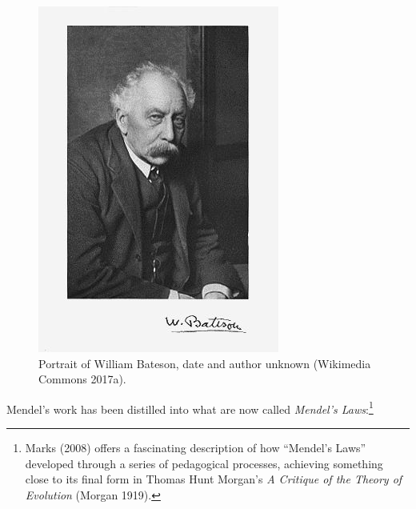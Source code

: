 \documentclass[
]{book}
\begin{document}
\begin{figure}

{\centering \includegraphics[width=1\linewidth]{figs/introduction/Bateson2} 

}

\caption{Portrait of William Bateson, date and author unknown (Wikimedia Commons 2017a).}\label{fig:bateson}
\end{figure}

Mendel's work has been distilled into what are now called \emph{Mendel's Laws}:\footnote{Marks (2008) offers a fascinating description of how ``Mendel's Laws'' developed through a series of pedagogical processes, achieving something close to its final form in Thomas Hunt Morgan's \emph{A Critique of the Theory of Evolution} (Morgan 1919).}
\end{document}
